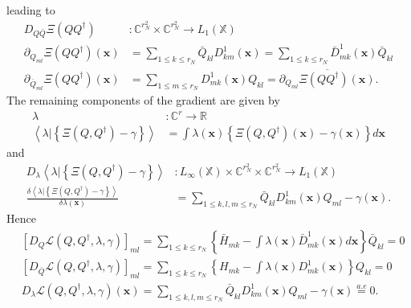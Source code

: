 \documentclass[aps,preprint]{revtex4}%
\begin{document}
leading to
\begin{align}
D_{Q\bar{Q}}\Xi\left(  QQ^{\dagger}\right)   &  :\mathbb{C}^{r_{N}^{2}}%
\times\mathbb{C}^{r_{N}^{2}}\rightarrow L_{1}\left(  \mathbb{X}\right)
\nonumber\\
\partial_{Q_{ml}}\Xi\left(  QQ^{\dagger}\right)  \left(  \mathbf{x}\right)
&  =\sum_{1\leq k\leq r_{N}}\bar{Q}_{kl}D_{km}^{1}\left(  \mathbf{x}\right)
=\sum_{1\leq k\leq r_{N}}\bar{D}_{mk}^{1}\left(  \mathbf{x}\right)  \bar
{Q}_{kl}\nonumber\\
\partial_{\bar{Q}_{ml}}\Xi\left(  QQ^{\dagger}\right)  \left(  \mathbf{x}%
\right)   &  =\sum_{1\leq m\leq r_{N}}D_{mk}^{1}\left(  \mathbf{x}\right)
Q_{kl}=\overline{\partial_{Q_{ml}}\Xi\left(  QQ^{\dagger}\right)  \left(
\mathbf{x}\right)  }.
\end{align}
The remaining components of the gradient are given by
\begin{align}
\lambda &  :\mathbb{C}^{r}\rightarrow\mathbb{R}\nonumber\\
\left\langle \left.  \lambda\right\vert \left\{  \Xi\left(  Q,Q^{\dagger
}\right)  -\gamma\right\}  \right\rangle  &  =\int\lambda\left(
\mathbf{x}\right)  \left\{  \Xi\left(  Q,Q^{\dagger}\right)  \left(
\mathbf{x}\right)  -\gamma\left(  \mathbf{x}\right)  \right\}  d\mathbf{x}%
\end{align}
and
\begin{align}
D_{\lambda}\left\langle \left.  \lambda\right\vert \left\{  \Xi\left(
Q,Q^{\dagger}\right)  -\gamma\right\}  \right\rangle  &  :L_{\infty}\left(
\mathbb{X}\right)  \times\mathbb{C}^{r_{N}^{2}}\times\mathbb{C}^{r_{N}^{2}%
}\rightarrow L_{1}\left(  \mathbb{X}\right) \nonumber\\
\frac{\delta\left\langle \left.  \lambda\right\vert \left\{  \Xi\left(
Q,Q^{\dagger}\right)  -\gamma\right\}  \right\rangle }{\delta\lambda\left(
\mathbf{x}\right)  }  &  =\sum_{1\leq k,l,m\leq r_{N}}\bar{Q}_{kl}D_{km}%
^{1}\left(  \mathbf{x}\right)  Q_{ml}-\gamma\left(  \mathbf{x}\right)  .
\end{align}
Hence
\begin{align}
&  \left[  D_{Q}\mathcal{L}\left(  Q,Q^{\dagger},\lambda,\gamma\right)
\right]  _{ml}=\sum_{1\leq k\leq r_{N}}\left\{  \bar{H}_{mk}-\int
\lambda\left(  \mathbf{x}\right)  \bar{D}_{mk}^{1}\left(  \mathbf{x}\right)
d\mathbf{x}\right\}  \bar{Q}_{kl}=0\nonumber\\
&  \left[  D_{\bar{Q}}\mathcal{L}\left(  Q,Q^{\dagger},\lambda,\gamma\right)
\right]  _{ml}=\sum_{1\leq k\leq r_{N}}\left\{  H_{mk}-\int\lambda\left(
\mathbf{x}\right)  D_{mk}^{1}\left(  \mathbf{x}\right)  \right\}
Q_{kl}=0\nonumber\\
&  D_{\lambda}\mathcal{L}\left(  Q,Q^{\dagger},\lambda,\gamma\right)  \left(
\mathbf{x}\right)  =\sum_{1\leq k,l,m\leq r_{N}}\bar{Q}_{kl}D_{km}^{1}\left(
\mathbf{x}\right)  Q_{ml}-\gamma\left(  \mathbf{x}\right)  \overset{a.e}{=}0.
\end{align}
\end{document}
